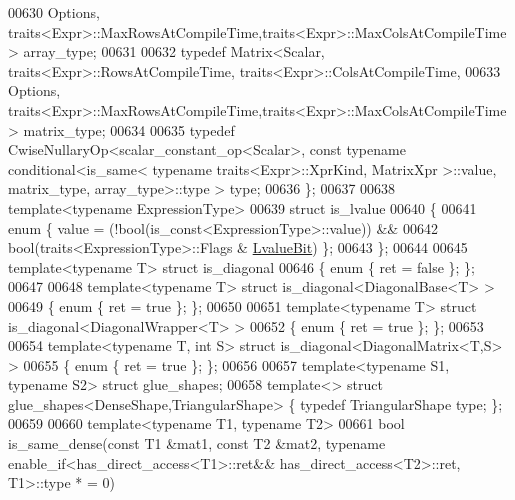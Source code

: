 \begin{DoxyCode}
{00630                 Options, traits<Expr>::MaxRowsAtCompileTime,traits<Expr>::MaxColsAtCompileTime> array\_type;
00631 
00632   \textcolor{keyword}{typedef} Matrix<Scalar,  traits<Expr>::RowsAtCompileTime,   traits<Expr>::ColsAtCompileTime,
00633                  Options, traits<Expr>::MaxRowsAtCompileTime,traits<Expr>::MaxColsAtCompileTime> 
      matrix\_type;
00634 
00635   \textcolor{keyword}{typedef} CwiseNullaryOp<scalar\_constant\_op<Scalar>, \textcolor{keyword}{const} \textcolor{keyword}{typename} conditional<is\_same< typename
       traits<Expr>::XprKind, MatrixXpr >::value, matrix\_type, array\_type>::type > type;
00636 \};
00637 
00638 \textcolor{keyword}{template}<\textcolor{keyword}{typename} ExpressionType>
00639 \textcolor{keyword}{struct }is\_lvalue
00640 \{
00641   \textcolor{keyword}{enum} \{ value = (!bool(is\_const<ExpressionType>::value)) &&
00642                  \textcolor{keywordtype}{bool}(traits<ExpressionType>::Flags & \hyperlink{group__flags_gae2c323957f20dfdc6cb8f44428eaec1a}{LvalueBit}) \};
00643 \};
00644 
00645 \textcolor{keyword}{template}<\textcolor{keyword}{typename} T> \textcolor{keyword}{struct }is\_diagonal
00646 \{ \textcolor{keyword}{enum} \{ ret = \textcolor{keyword}{false} \}; \};
00647 
00648 \textcolor{keyword}{template}<\textcolor{keyword}{typename} T> \textcolor{keyword}{struct }is\_diagonal<DiagonalBase<T> >
00649 \{ \textcolor{keyword}{enum} \{ ret = \textcolor{keyword}{true} \}; \};
00650 
00651 \textcolor{keyword}{template}<\textcolor{keyword}{typename} T> \textcolor{keyword}{struct }is\_diagonal<DiagonalWrapper<T> >
00652 \{ \textcolor{keyword}{enum} \{ ret = \textcolor{keyword}{true} \}; \};
00653 
00654 \textcolor{keyword}{template}<\textcolor{keyword}{typename} T, \textcolor{keywordtype}{int} S> \textcolor{keyword}{struct }is\_diagonal<DiagonalMatrix<T,S> >
00655 \{ \textcolor{keyword}{enum} \{ ret = \textcolor{keyword}{true} \}; \};
00656 
00657 \textcolor{keyword}{template}<\textcolor{keyword}{typename} S1, \textcolor{keyword}{typename} S2> \textcolor{keyword}{struct }glue\_shapes;
00658 \textcolor{keyword}{template}<> \textcolor{keyword}{struct }glue\_shapes<DenseShape,TriangularShape> \{ \textcolor{keyword}{typedef} TriangularShape type;  \};
00659 
00660 \textcolor{keyword}{template}<\textcolor{keyword}{typename} T1, \textcolor{keyword}{typename} T2>
00661 \textcolor{keywordtype}{bool} is\_same\_dense(\textcolor{keyword}{const} T1 &mat1, \textcolor{keyword}{const} T2 &mat2, \textcolor{keyword}{typename} enable\_if<has\_direct\_access<T1>::ret&&
      has\_direct\_access<T2>::ret, T1>::type * = 0)
}
\end{DoxyCode}
